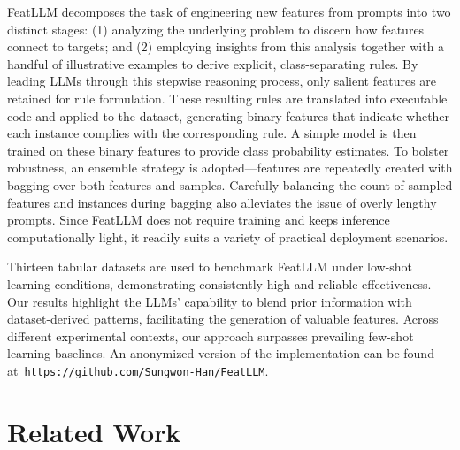 \textsf{FeatLLM} decomposes the task of engineering new features from prompts into two distinct stages: (1) analyzing the underlying problem to discern how features connect to targets; and (2) employing insights from this analysis together with a handful of illustrative examples to derive explicit, class-separating rules. By leading LLMs through this stepwise reasoning process, only salient features are retained for rule formulation. These resulting rules are translated into executable code and applied to the dataset, generating binary features that indicate whether each instance complies with the corresponding rule. A simple model is then trained on these binary features to provide class probability estimates. To bolster robustness, an ensemble strategy is adopted—features are repeatedly created with bagging over both features and samples. Carefully balancing the count of sampled features and instances during bagging also alleviates the issue of overly lengthy prompts. Since \textsf{FeatLLM} does not require training and keeps inference computationally light, it readily suits a variety of practical deployment scenarios.

Thirteen tabular datasets are used to benchmark \textsf{FeatLLM} under low-shot learning conditions, demonstrating consistently high and reliable effectiveness. Our results highlight the LLMs’ capability to blend prior information with dataset-derived patterns, facilitating the generation of valuable features. Across different experimental contexts, our approach surpasses prevailing few-shot learning baselines. An anonymized version of the implementation can be found at~\texttt{https://github.com/Sungwon-Han/FeatLLM}.

\section{Related Work}

